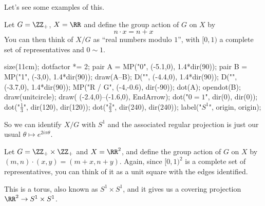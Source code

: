 Let's see some examples of this.


\begin{example}[$\RR \to S^1$ is regular]
	Let $G = \ZZ_+$, $X = \RR$
	and define the group action of $G$ on $X$ by 
	\[ n \cdot x = n + x \]
	You can then think of $X/G$ as ``real numbers modulo $1$'',
	with $[0,1)$ a complete set of representatives and $0 \sim 1$.
	\begin{center}
		\begin{asy}
			size(11cm);
			dotfactor *= 2;
			pair A = MP("0", (-5.1,0), 1.4*dir(90));
			pair B = MP("1", (-3,0), 1.4*dir(90));
			draw(A--B);
			D("", (-4.4,0), 1.4*dir(90));
			D("", (-3.7,0), 1.4*dir(90));
			MP("\mathbb R / G", (-4,-0.6), dir(-90));
			dot(A); opendot(B);
			draw(unitcircle);
			draw( (-2.4,0)--(-1.6,0), EndArrow);
			dot("$0=1$", dir(0), dir(0));
			dot("$\frac13$", dir(120), dir(120));
			dot("$\frac23$", dir(240), dir(240));
			label("$S^1$", origin, origin);
		\end{asy}
	\end{center}
	So we can identify $X/G$ with $S^1$
	and the associated regular projection
	is just our usual $\theta \mapsto e^{2i\pi \theta}$.
\end{example}
	
\begin{example}
	Let $G = \ZZ_+ \times \ZZ_+$ and $X = \RR^2$,
	and define the group action of $G$ on $X$ by $(m,n) \cdot (x,y)
	= (m+x, n+y)$.
	Again, since $[0,1)^2$ is a complete set of representatives,
	you can think of it as a unit square with the edges identified.

	This is a torus, also known as $S^1 \times S^1$,
	and it gives us a covering projection $\RR^2 \to S^1 \times S^1$.
\end{example}

